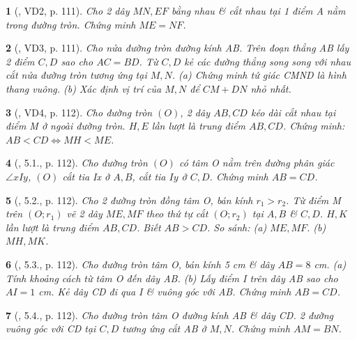 \documentclass{article}
\newtheorem{baitoan}{}
\begin{document}
\begin{baitoan}[\cite{Binh_boi_duong_Toan_9_tap_1}, VD2, p. 111]
	Cho 2 dây $MN,EF$ bằng nhau \& cắt nhau tại 1 điểm A nằm trong đường tròn. Chứng minh $ME = NF$.
\end{baitoan}

\begin{baitoan}[\cite{Binh_boi_duong_Toan_9_tap_1}, VD3, p. 111]
	Cho nửa đường tròn đường kính AB. Trên đoạn thẳng AB lấy 2 điểm $C,D$ sao cho $AC = BD$. Từ $C,D$ kẻ các đường thẳng song song với nhau cắt nửa đường tròn tương ứng tại $M,N$. (a) Chứng minh tứ giác CMND là hình thang vuông. (b) Xác định vị trí của $M,N$ để $CM + DN$ nhỏ nhất.
\end{baitoan}

\begin{baitoan}[\cite{Binh_boi_duong_Toan_9_tap_1}, VD4, p. 112]
	Cho đường tròn $(O)$, 2 dây $AB,CD$ kéo dài cắt nhau tại điểm M ở ngoài đường tròn. $H,E$ lần lượt là trung điểm $AB,CD$. Chứng minh: $AB < CD\Leftrightarrow MH < ME$.
\end{baitoan}

\begin{baitoan}[\cite{Binh_boi_duong_Toan_9_tap_1}, 5.1., p. 112]
	Cho đường tròn $(O)$ có tâm O nằm trên đường phân giác $\angle{xIy}$, $(O)$ cắt tia Ix ở $A,B$, cắt tia $Iy$ ở $C,D$. Chứng minh $AB = CD$.
\end{baitoan}

\begin{baitoan}[\cite{Binh_boi_duong_Toan_9_tap_1}, 5.2., p. 112]
	Cho 2 đường tròn đồng tâm O, bán kính $r_1 > r_2$. Từ điểm M trên $(O;r_1)$ vẽ 2 dây $ME,MF$ theo thứ tự cắt $(O;r_2)$ tại $A,B$ \& $C,D$. $H,K$ lần lượt là trung điểm $AB,CD$. Biết $AB > CD$. So sánh: (a) $ME,MF$. (b) $MH,MK$.
\end{baitoan}

\begin{baitoan}[\cite{Binh_boi_duong_Toan_9_tap_1}, 5.3., p. 112]
	Cho đường tròn tâm O, bán kính {\rm5 cm} \& dây $AB = 8$ {\rm cm}. (a) Tính khoảng cách từ tâm O đến dây AB. (b) Lấy điểm I trên dây AB sao cho $AI = 1$ {\rm cm}. Kẻ dây CD đi qua I \& vuông góc với AB. Chứng minh $AB = CD$.
\end{baitoan}

\begin{baitoan}[\cite{Binh_boi_duong_Toan_9_tap_1}, 5.4., p. 112]
	Cho đường tròn tâm O đường kính AB \& dây CD. 2 đường vuông góc với CD tại $C,D$ tương ứng cắt AB ở $M,N$. Chứng minh $AM = BN$.
\end{baitoan}
\end{document}
